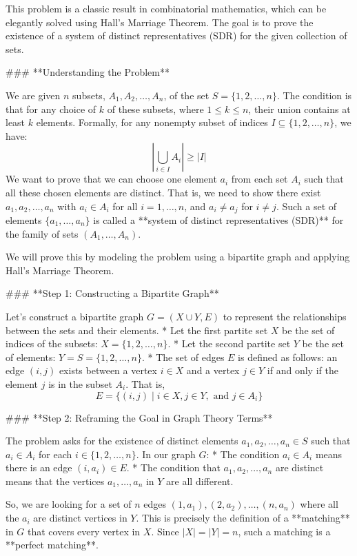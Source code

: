 This problem is a classic result in combinatorial mathematics, which can be elegantly solved using Hall's Marriage Theorem. The goal is to prove the existence of a system of distinct representatives (SDR) for the given collection of sets.

### **Understanding the Problem**

We are given $n$ subsets, $A_1, A_2, \dots, A_n$, of the set $S = \{1, 2, \dots, n\}$. The condition is that for any choice of $k$ of these subsets, where $1 \le k \le n$, their union contains at least $k$ elements. Formally, for any nonempty subset of indices $I \subseteq \{1, 2, \dots, n\}$, we have:
$$|\bigcup_{i \in I} A_i| \ge |I|$$
We want to prove that we can choose one element $a_i$ from each set $A_i$ such that all these chosen elements are distinct. That is, we need to show there exist $a_1, a_2, \dots, a_n$ with $a_i \in A_i$ for all $i=1, \dots, n$, and $a_i \neq a_j$ for $i \neq j$. Such a set of elements $\{a_1, \dots, a_n\}$ is called a **system of distinct representatives (SDR)** for the family of sets $(A_1, \dots, A_n)$.

We will prove this by modeling the problem using a bipartite graph and applying Hall's Marriage Theorem.

### **Step 1: Constructing a Bipartite Graph**

Let's construct a bipartite graph $G = (X \cup Y, E)$ to represent the relationships between the sets and their elements.
*   Let the first partite set $X$ be the set of indices of the subsets: $X = \{1, 2, \dots, n\}$.
*   Let the second partite set $Y$ be the set of elements: $Y = S = \{1, 2, \dots, n\}$.
*   The set of edges $E$ is defined as follows: an edge $(i, j)$ exists between a vertex $i \in X$ and a vertex $j \in Y$ if and only if the element $j$ is in the subset $A_i$. That is,
    $$E = \{ (i, j) \mid i \in X, j \in Y, \text{ and } j \in A_i \}$$

### **Step 2: Reframing the Goal in Graph Theory Terms**

The problem asks for the existence of distinct elements $a_1, a_2, \dots, a_n \in S$ such that $a_i \in A_i$ for each $i \in \{1, 2, \dots, n\}$. In our graph $G$:
*   The condition $a_i \in A_i$ means there is an edge $(i, a_i) \in E$.
*   The condition that $a_1, a_2, \dots, a_n$ are distinct means that the vertices $a_1, \dots, a_n$ in $Y$ are all different.

So, we are looking for a set of $n$ edges $(1, a_1), (2, a_2), \dots, (n, a_n)$ where all the $a_i$ are distinct vertices in $Y$. This is precisely the definition of a **matching** in $G$ that covers every vertex in $X$. Since $|X| = |Y| = n$, such a matching is a **perfect matching**.

